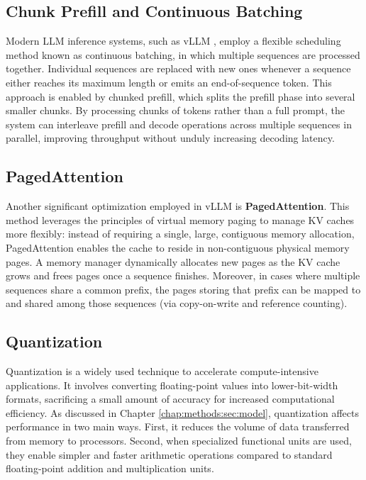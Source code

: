 \subsection{Chunk Prefill and Continuous Batching}

Modern LLM inference systems, such as vLLM \cite{kwon2023efficient}, employ a flexible scheduling method known as continuous batching, in which multiple sequences are processed together. Individual sequences are replaced with new ones whenever a sequence either reaches its maximum length or emits an end-of-sequence token. This approach is enabled by chunked prefill, which splits the prefill phase into several smaller chunks. By processing chunks of tokens rather than a full prompt, the system can interleave prefill and decode operations across multiple sequences in parallel, improving throughput without unduly increasing decoding latency.

\subsection{PagedAttention}

Another significant optimization employed in vLLM \cite{kwon2023efficient} is \textbf{PagedAttention}. This method leverages the principles of virtual memory paging to manage KV caches more flexibly: instead of requiring a single, large, contiguous memory allocation, PagedAttention enables the cache to reside in non-contiguous physical memory pages. A memory manager dynamically allocates new pages as the KV cache grows and frees pages once a sequence finishes. Moreover, in cases where multiple sequences share a common prefix, the pages storing that prefix can be mapped to and shared among those sequences (via copy-on-write and reference counting).

\subsection{Quantization}

Quantization is a widely used technique to accelerate compute-intensive applications. It involves converting floating-point values into lower-bit-width formats, sacrificing a small amount of accuracy for increased computational efficiency. As discussed in Chapter \ref{chap:methods:sec:model}, quantization affects performance in two main ways. First, it reduces the volume of data transferred from memory to processors. Second, when specialized functional units are used, they enable simpler and faster arithmetic operations compared to standard floating-point addition and multiplication units.

